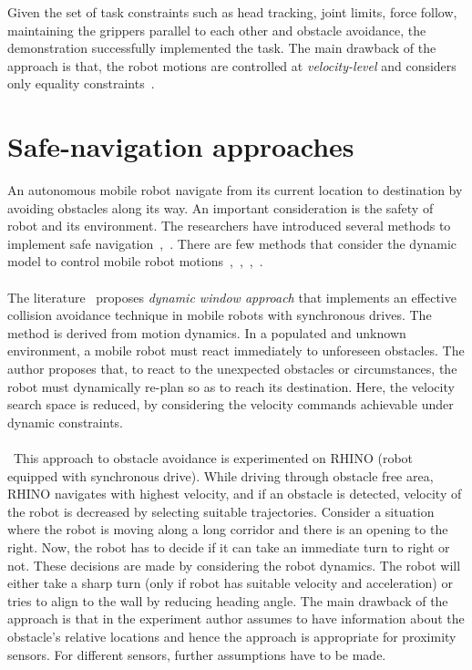 Given the set of task constraints such as head tracking, joint limits, force follow, maintaining the grippers parallel to each other and obstacle avoidance, the demonstration successfully implemented the task. The main drawback of the approach is that, the robot motions are controlled at \textit{velocity-level} and considers only equality constraints~\cite{itasc-software}.

\section{Safe-navigation approaches} \label{sec:dynamic-modeling}

An autonomous mobile robot navigate from its current location to destination by avoiding obstacles along its way. An important consideration is the safety of robot and its environment. The researchers have introduced several methods to implement safe navigation~\cite{borenstein1990real},~\cite{adouane2011mobile}. There are few methods that consider the dynamic model to control mobile robot motions~\cite{fox1997dynamic},~\cite{asensio2002kinematic},~\cite{ge2002dynamic},~\cite{borenstein1989real}. 

\paragraph{}The literature~\cite{fox1997dynamic} proposes \textit{dynamic window approach} that implements an effective collision avoidance technique in mobile robots with synchronous drives. The method is derived from motion dynamics. In a populated and unknown environment, a mobile robot must react immediately to unforeseen obstacles. The author proposes that, to react to the unexpected obstacles or circumstances, the robot must dynamically re-plan so as to reach its destination. Here, the velocity search space is reduced, by considering the velocity commands achievable under dynamic constraints. 

\paragraph{}\cite{fox1997dynamic}~This approach to obstacle avoidance is experimented on RHINO (robot equipped with synchronous drive). While driving through obstacle free area, RHINO navigates with highest velocity, and if an obstacle is detected, velocity of the robot is decreased by selecting suitable trajectories. Consider a situation where the robot is moving along a long corridor and there is an opening to the right. Now, the robot has to decide if it can take an immediate turn to right or not. These decisions are made by considering the robot dynamics. The robot will either take a sharp turn (only if robot has suitable velocity and acceleration) or tries to align to the wall by reducing heading angle. The main drawback of the approach is that in the experiment author assumes to have information about the obstacle's relative locations and hence the approach is appropriate for proximity sensors. For different sensors, further assumptions have to be made. 

